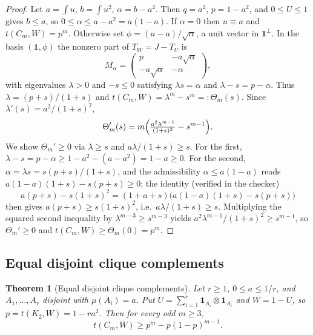 \documentclass[11pt]{article}
\newtheorem{theorem}{Theorem}[section]
\newcommand{\one}{\mathbf 1}
\begin{document}
\begin{proof}
Let $a=\int u$, $b=\int u^2$, $\alpha=b-a^2$.  Then $q=a^2$, $p=1-a^2$, and $0\le U\le1$ gives $b\le a$, so $0\le\alpha\le a-a^2=a(1-a)$.  If $\alpha=0$ then $u\equiv a$ and $t(C_m,W)=p^m$.  Otherwise set $\phi=(u-a)/\sqrt\alpha$, a unit vector in $\one^\perp$.  In the basis $(\one,\phi)$ the nonzero part of $T_W=J-T_U$ is
\[
        M_\alpha=\begin{pmatrix} p & -a\sqrt\alpha\\ -a\sqrt\alpha & -\alpha\end{pmatrix},
\]
with eigenvalues $\lambda>0$ and $-s\le0$ satisfying $\lambda s=\alpha$ and $\lambda-s=p-\alpha$.  Thus $\lambda=(p+s)/(1+s)$ and $t(C_m,W)=\lambda^m-s^m=:\Theta_m(s)$.  Since $\lambda'(s)=a^2/(1+s)^2$,
\[
        \Theta_m'(s)=m\Bigl(\tfrac{a^2\lambda^{m-1}}{(1+s)^2}-s^{m-1}\Bigr).
\]
We show $\Theta_m'\ge0$ via $\lambda\ge s$ and $a\lambda/(1+s)\ge s$.  For the first, $\lambda-s=p-\alpha\ge1-a^2-(a-a^2)=1-a\ge0$.  For the second, $\alpha=\lambda s=s(p+s)/(1+s)$, and the admissibility $\alpha\le a(1-a)$ reads $a(1-a)(1+s)-s(p+s)\ge0$; the identity (verified in the checker)
\[
        a(p+s)-s(1+s)^2=(1+a+s)\bigl(a(1-a)(1+s)-s(p+s)\bigr)
\]
then gives $a(p+s)\ge s(1+s)^2$, i.e.\ $a\lambda/(1+s)\ge s$.  Multiplying the squared second inequality by $\lambda^{m-3}\ge s^{m-3}$ yields $a^2\lambda^{m-1}/(1+s)^2\ge s^{m-1}$, so $\Theta_m'\ge0$ and $t(C_m,W)\ge\Theta_m(0)=p^m$.
\end{proof}

\subsection{Equal disjoint clique complements}\label{subsec:equal-clique}

\begin{theorem}[Equal disjoint clique complements]\label{thm:equal-clique}
Let $r\ge1$, $0\le a\le1/r$, and $A_1,\ldots,A_r$ disjoint with $\mu(A_i)=a$.  Put $U=\sum_{i=1}^r\mathbf 1_{A_i}\otimes\mathbf 1_{A_i}$ and $W=1-U$, so $p=t(K_2,W)=1-ra^2$.  Then for every odd $m\ge3$,
\[
        t(C_m,W)\ge p^m-p(1-p)^{m-1}.
\]
\end{theorem}
\end{document}
